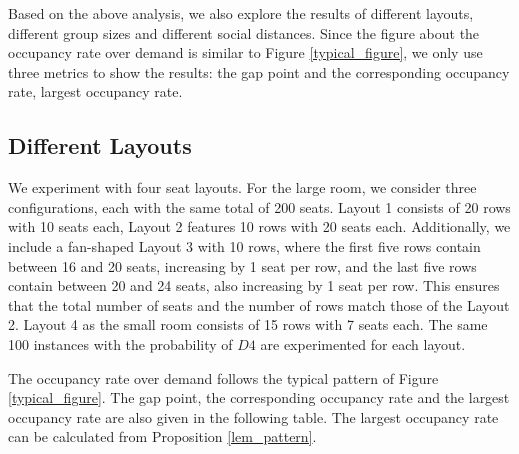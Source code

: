 

Based on the above analysis, we also explore the results of different layouts, different group sizes and different social distances. Since the figure about the occupancy rate over demand is similar to Figure \ref{typical_figure}, we only use three metrics to show the results: the gap point and the corresponding occupancy rate, largest occupancy rate.

\subsection*{Different Layouts}
We experiment with four seat layouts. For the large room, we consider three configurations, each with the same total of 200 seats. Layout 1 consists of 20 rows with 10 seats each, Layout 2 features 10 rows with 20 seats each. Additionally, we include a fan-shaped Layout 3 with 10 rows, where the first five rows contain between 16 and 20 seats, increasing by 1 seat per row, and the last five rows contain between 20 and 24 seats, also increasing by 1 seat per row. This ensures that the total number of seats and the number of rows match those of the Layout 2. Layout 4 as the small room consists of 15 rows with 7 seats each. The same 100 instances with the probability of $D4$ are experimented for each layout.

The occupancy rate over demand follows the typical pattern of Figure \ref{typical_figure}. The gap point, the corresponding occupancy rate and the largest occupancy rate are also given in the following table. The largest occupancy rate can be calculated from Proposition \ref{lem_pattern}.

